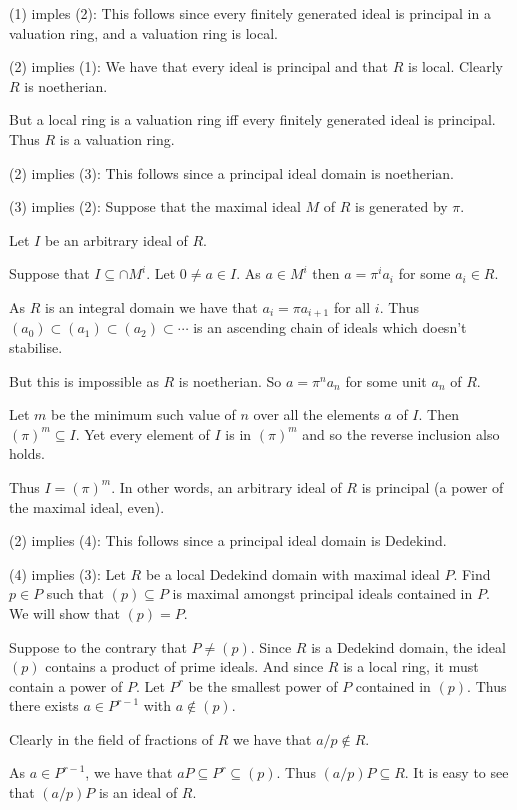 \documentclass[10pt]{article}
\newenvironment{proof}[1][Proof]{\begin{trivlist}
\item[\hskip \labelsep {\bfseries #1}]}{\end{trivlist}}
\begin{document}
\begin{proof}
(1) imples (2): This follows since every finitely generated ideal is principal in a valuation ring, and a valuation ring is local.

(2) implies (1): We have that every ideal is principal and that $R$ is local. Clearly $R$ is noetherian.

But a local ring is a valuation ring iff every finitely generated ideal is principal. Thus $R$ is a valuation ring.

(2) implies (3): This follows since a principal ideal domain is noetherian.

(3) implies (2): Suppose that the maximal ideal $M$ of $R$ is generated by $\pi$. 

Let $I$ be an arbitrary ideal of $R$. 

Suppose that $I \subseteq \cap M^i$. Let $0 \neq a \in I$. As $a \in M^i$ then $a = \pi^i a_i$ for some $a_i \in R$.

As $R$ is an integral domain we have that $a_i = \pi a_{i+1}$ for all $i$. Thus $(a_0) \subset (a_1) \subset (a_2) \subset \cdots$ is an ascending chain of ideals which doesn't stabilise.

But this is impossible as $R$ is noetherian. So $a = \pi^n a_n$ for some unit $a_n$ of $R$.

Let $m$ be the minimum such value of $n$ over all the elements $a$ of $I$. Then $(\pi)^m \subseteq I$. Yet every element of $I$ is in $(\pi)^m$ and so the reverse inclusion also holds.

Thus $I = (\pi)^m$. In other words, an arbitrary ideal of $R$ is principal (a power of the maximal ideal, even).

(2) implies (4): This follows since a principal ideal domain is Dedekind.

(4) implies (3): Let $R$ be a local Dedekind domain with maximal ideal $P$. Find $p \in P$ such that $(p) \subseteq P$ is maximal amongst principal ideals contained in $P$. We will show that $(p) = P$.

Suppose to the contrary that $P \neq (p)$. Since $R$ is a Dedekind domain, the ideal $(p)$ contains a product of prime ideals. And since $R$ is a local ring, it must contain a power of $P$. Let $P^r$ be the smallest power of $P$ contained in $(p)$. Thus there exists $a \in P^{r-1}$ with $a \notin (p)$. 

Clearly in the field of fractions of $R$ we have that $a/p \notin R$.

As $a \in P^{r-1}$, we have that $aP \subseteq P^r \subseteq (p)$. Thus $(a/p)P \subseteq R$. It is easy to see that $(a/p)P$ is an ideal of $R$. 


\end{proof}
\end{document}
